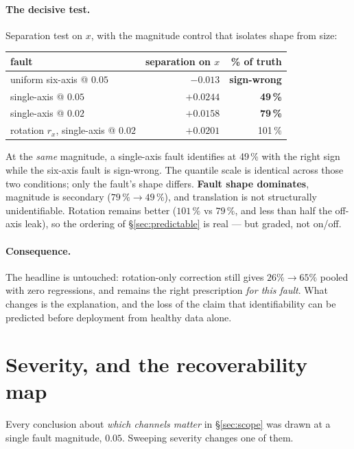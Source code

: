 \documentclass[11pt,a4paper]{article}
\begin{document}
\paragraph{The decisive test.}
Separation test on $x$, with the magnitude control that isolates shape from size:

\begin{center}
\begin{tabular}{lrr}
\toprule
fault & separation on $x$ & \% of truth \\
\midrule
uniform six-axis @ $0.05$ & $-0.013$ & \textbf{sign-wrong} \\
single-axis @ $0.05$      & $+0.0244$ & \textbf{49\,\%} \\
single-axis @ $0.02$      & $+0.0158$ & \textbf{79\,\%} \\
rotation $r_x$, single-axis @ $0.02$ & $+0.0201$ & 101\,\% \\
\bottomrule
\end{tabular}
\end{center}

At the \emph{same} magnitude, a single-axis fault identifies at 49\,\% with the
right sign while the six-axis fault is sign-wrong. The quantile scale is identical
across those two conditions; only the fault's shape differs. \textbf{Fault shape dominates}, magnitude is secondary ($79\,\% \to 49\,\%$), and translation is not
structurally unidentifiable. Rotation remains better ($101\,\%$ vs $79\,\%$, and
less than half the off-axis leak), so the ordering of \S\ref{sec:predictable} is
real --- but graded, not on/off.

\paragraph{Consequence.}
The headline is untouched: rotation-only correction still gives $26\% \to 65\%$
pooled with zero regressions, and remains the right prescription \emph{for this
fault}. What changes is the explanation, and the loss of the claim that
identifiability can be predicted before deployment from healthy data alone.

\section{Severity, and the recoverability map}
\label{sec:severity}

Every conclusion about \emph{which channels matter} in \S\ref{sec:scope} was drawn at a
single fault magnitude, $0.05$. Sweeping severity changes one of them.
\end{document}

